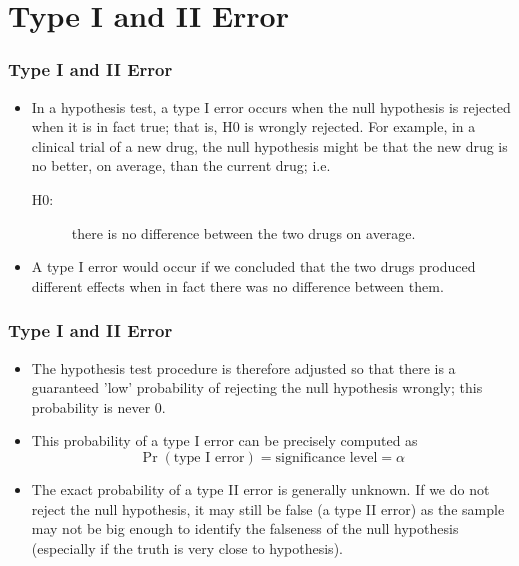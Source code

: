 \documentclass{beamer}
\begin{document}
\section{Type I and II Error}
\begin{frame}
\frametitle{Type I and II Error}
\large
\begin{itemize}
\item In a hypothesis test, a type I error occurs when the null hypothesis
is rejected when it is in fact true; that is, H0 is wrongly rejected.
For example, in a clinical trial of a new drug, the null hypothesis
might be that the new drug is no better, on average, than the
current drug; i.e.
\begin{description}
	\item[H0: ] there is no difference between the two drugs on average.
\end{description}

\item A type I error would occur if we concluded that the two drugs
produced different effects when in fact there was no difference
between them.
\end{itemize}
\end{frame}
\begin{frame}
	\frametitle{Type I and II Error}
	\large
\begin{itemize}
\item The hypothesis test procedure is therefore adjusted so that there is
a guaranteed 'low' probability of rejecting the null hypothesis
wrongly; this probability is never 0.
\item This probability of a type I error can be precisely computed as
\[\Pr(\mbox{type I error}) = \mbox{significance level} = \alpha\]
\item The exact probability of a type II error is generally unknown.
If we do not reject the null hypothesis, it may still be false (a type
II error) as the sample may not be big enough to identify the
falseness of the null hypothesis (especially if the truth is very close
to hypothesis).
\end{itemize}
\end{frame}
\end{document}
